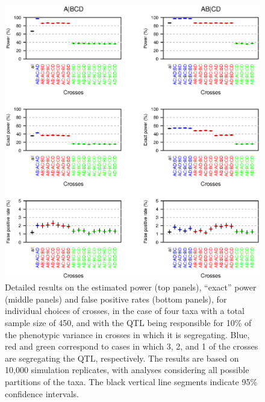 \documentclass[12pt,letterpaper]{article}
\begin{document}
\newpage
\begin{figure}
\centering
\includegraphics[width=\textwidth]{Figs/fig5.eps}

\vspace{1cm}

\caption{Detailed results on the estimated power (top panels),
  ``exact'' power (middle panels) and false positive rates (bottom
  panels), for individual choices of crosses, in the case of four taxa
  with a total sample size of 450, and with the QTL being responsible
  for 10\% of the phenotypic variance in crosses in which it is
  segregating. Blue, red and green correspond to cases in which 3, 2,
  and 1 of the crosses are segregating the QTL, respectively.  The
  results are based on 10,000 simulation replicates, with analyses
  considering all possible partitions of the taxa.  The black vertical
  line segments indicate 95\% confidence
  intervals.\label{fig:detailedpower}}
\end{figure}
\end{document}
